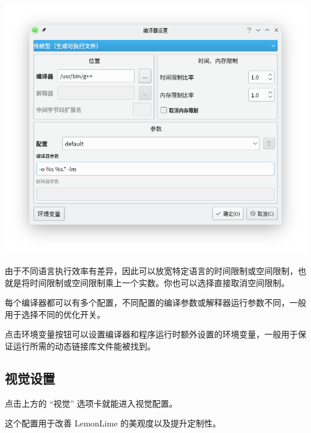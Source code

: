 \documentclass[UTF-8]{ctexart}
\begin{document}
				\begin{center}
				\includegraphics[scale=0.7]{pics/compilersettings2.png}
				\end{center}
				
				由于不同语言执行效率有差异，因此可以放宽特定语言的时间限制或空间限制，也就是将时间限制或空间限制乘上一个实数。你也可以选择直接取消空间限制。
				
				每个编译器都可以有多个配置，不同配置的编译参数或解释器运行参数不同，一般用于选择不同的优化开关。
				
				点击环境变量按钮可以设置编译器和程序运行时额外设置的环境变量，一般用于保证运行所需的动态链接库文件能被找到。
				
				
			\subsection{视觉设置}
				
				点击上方的 “视觉” 选项卡就能进入视觉配置。
				
				这个配置用于改善 LemonLime 的美观度以及提升定制性。
				
\end{document}
